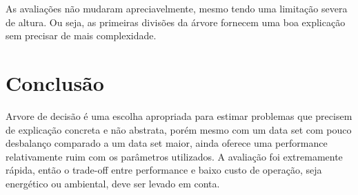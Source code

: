 \documentclass[12pt]{article}
\begin{document}
As avaliações não mudaram apreciavelmente, mesmo tendo uma limitação severa de altura. Ou seja, as primeiras divisões da árvore fornecem uma boa explicação sem precisar de mais complexidade.

\section{Conclusão}
Arvore de decisão é uma escolha apropriada para estimar problemas que precisem de explicação concreta e não abstrata, porém mesmo com um data set com pouco desbalanço comparado a um data set maior, ainda oferece uma performance relativamente ruim com os parâmetros utilizados. A avaliação foi extremamente rápida, então o trade-off entre performance e baixo custo de operação, seja energético ou ambiental, deve ser levado em conta.



\end{document}
